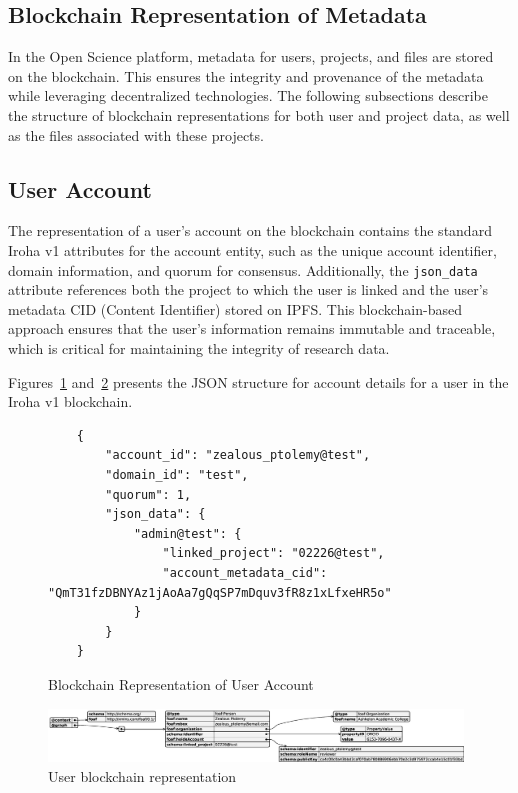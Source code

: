 \documentclass[final]{rc-book-2.14}
\begin{document}
\subsection{Blockchain Representation of Metadata}

In the Open Science platform, metadata for users, projects, and files are stored on the blockchain. This ensures the integrity and provenance of the metadata while leveraging decentralized technologies. The following subsections describe the structure of blockchain representations for both user and project data, as well as the files associated with these projects.

\subsection{User Account}

The representation of a user's account on the blockchain contains the standard Iroha v1 attributes for the account entity, such as the unique account identifier, domain information, and quorum for consensus. Additionally, the \texttt{json\_data} attribute references both the project to which the user is linked and the user's metadata CID (Content Identifier) stored on IPFS. This blockchain-based approach ensures that the user’s information remains immutable and traceable, which is critical for maintaining the integrity of research data.

Figures~\ref{fig:user_blockchain_representation} and~\ref{fig:user_bct_rep} presents the JSON structure for account details for a user in the Iroha v1 blockchain.

\begin{figure}[h]
    \centering
    \caption{Blockchain Representation of User Account}
    \label{fig:user_blockchain_representation}
    \begin{verbatim}
    {
        "account_id": "zealous_ptolemy@test",
        "domain_id": "test",
        "quorum": 1,
        "json_data": {
            "admin@test": {
                "linked_project": "02226@test",
                "account_metadata_cid": "QmT31fzDBNYAz1jAoAa7gQqSP7mDquv3fR8z1xLfxeHR5o"
            }
        }
    }
    \end{verbatim}
\end{figure}

\begin{figure}[htbp]
    \centering
    \includegraphics[width=0.98\textwidth, keepaspectratio]{fig/user_bct_representation.eps}
    \caption{User blockchain representation}
    \label{fig:user_bct_rep}
\end{figure}
\end{document}
